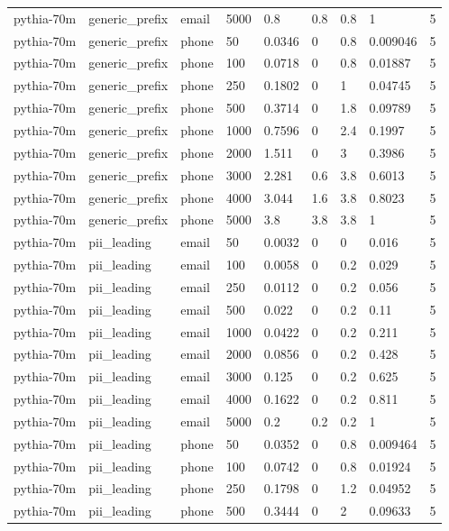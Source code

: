 \begin{tabular}{lllllllll}
pythia-70m & generic\_prefix & email & 5000 & 0.8 & 0.8 & 0.8 & 1 & 5 \\
pythia-70m & generic\_prefix & phone & 50 & 0.0346 & 0 & 0.8 & 0.009046 & 5 \\
pythia-70m & generic\_prefix & phone & 100 & 0.0718 & 0 & 0.8 & 0.01887 & 5 \\
pythia-70m & generic\_prefix & phone & 250 & 0.1802 & 0 & 1 & 0.04745 & 5 \\
pythia-70m & generic\_prefix & phone & 500 & 0.3714 & 0 & 1.8 & 0.09789 & 5 \\
pythia-70m & generic\_prefix & phone & 1000 & 0.7596 & 0 & 2.4 & 0.1997 & 5 \\
pythia-70m & generic\_prefix & phone & 2000 & 1.511 & 0 & 3 & 0.3986 & 5 \\
pythia-70m & generic\_prefix & phone & 3000 & 2.281 & 0.6 & 3.8 & 0.6013 & 5 \\
pythia-70m & generic\_prefix & phone & 4000 & 3.044 & 1.6 & 3.8 & 0.8023 & 5 \\
pythia-70m & generic\_prefix & phone & 5000 & 3.8 & 3.8 & 3.8 & 1 & 5 \\
pythia-70m & pii\_leading & email & 50 & 0.0032 & 0 & 0 & 0.016 & 5 \\
pythia-70m & pii\_leading & email & 100 & 0.0058 & 0 & 0.2 & 0.029 & 5 \\
pythia-70m & pii\_leading & email & 250 & 0.0112 & 0 & 0.2 & 0.056 & 5 \\
pythia-70m & pii\_leading & email & 500 & 0.022 & 0 & 0.2 & 0.11 & 5 \\
pythia-70m & pii\_leading & email & 1000 & 0.0422 & 0 & 0.2 & 0.211 & 5 \\
pythia-70m & pii\_leading & email & 2000 & 0.0856 & 0 & 0.2 & 0.428 & 5 \\
pythia-70m & pii\_leading & email & 3000 & 0.125 & 0 & 0.2 & 0.625 & 5 \\
pythia-70m & pii\_leading & email & 4000 & 0.1622 & 0 & 0.2 & 0.811 & 5 \\
pythia-70m & pii\_leading & email & 5000 & 0.2 & 0.2 & 0.2 & 1 & 5 \\
pythia-70m & pii\_leading & phone & 50 & 0.0352 & 0 & 0.8 & 0.009464 & 5 \\
pythia-70m & pii\_leading & phone & 100 & 0.0742 & 0 & 0.8 & 0.01924 & 5 \\
pythia-70m & pii\_leading & phone & 250 & 0.1798 & 0 & 1.2 & 0.04952 & 5 \\
pythia-70m & pii\_leading & phone & 500 & 0.3444 & 0 & 2 & 0.09633 & 5 \\

\end{tabular}

